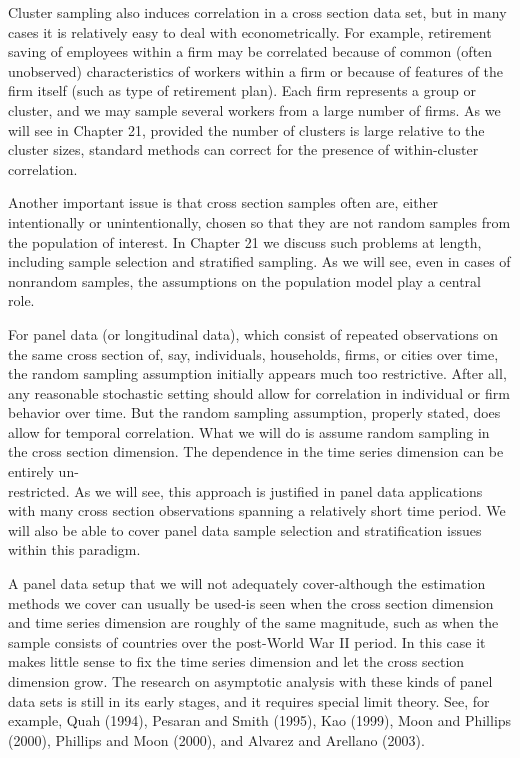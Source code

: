 \documentclass[10pt]{article}
\begin{document}
Cluster sampling also induces correlation in a cross section data set, but in many cases it is relatively easy to deal with econometrically. For example, retirement saving of employees within a firm may be correlated because of common (often unobserved) characteristics of workers within a firm or because of features of the firm itself (such as type of retirement plan). Each firm represents a group or cluster, and we may sample several workers from a large number of firms. As we will see in Chapter 21, provided the number of clusters is large relative to the cluster sizes, standard methods can correct for the presence of within-cluster correlation.

Another important issue is that cross section samples often are, either intentionally or unintentionally, chosen so that they are not random samples from the population of interest. In Chapter 21 we discuss such problems at length, including sample selection and stratified sampling. As we will see, even in cases of nonrandom samples, the assumptions on the population model play a central role.

For panel data (or longitudinal data), which consist of repeated observations on the same cross section of, say, individuals, households, firms, or cities over time, the random sampling assumption initially appears much too restrictive. After all, any reasonable stochastic setting should allow for correlation in individual or firm behavior over time. But the random sampling assumption, properly stated, does allow for temporal correlation. What we will do is assume random sampling in the cross section dimension. The dependence in the time series dimension can be entirely un-\\
restricted. As we will see, this approach is justified in panel data applications with many cross section observations spanning a relatively short time period. We will also be able to cover panel data sample selection and stratification issues within this paradigm.

A panel data setup that we will not adequately cover-although the estimation methods we cover can usually be used-is seen when the cross section dimension and time series dimension are roughly of the same magnitude, such as when the sample consists of countries over the post-World War II period. In this case it makes little sense to fix the time series dimension and let the cross section dimension grow. The research on asymptotic analysis with these kinds of panel data sets is still in its early stages, and it requires special limit theory. See, for example, Quah (1994), Pesaran and Smith (1995), Kao (1999), Moon and Phillips (2000), Phillips and Moon (2000), and Alvarez and Arellano (2003).
\end{document}
